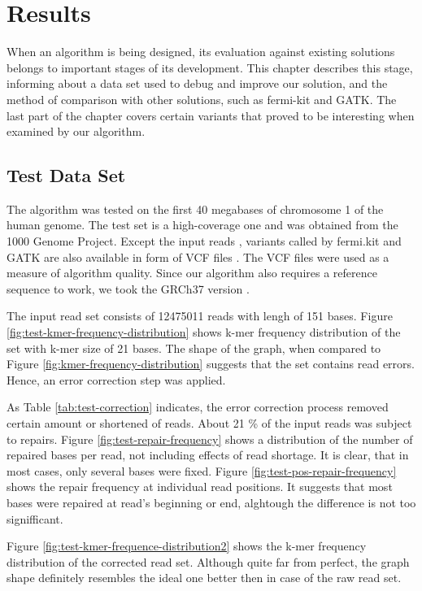 \chapter{Results}
\label{chap:results}

When an algorithm is being designed, its evaluation against existing solutions belongs to important stages of its development. This chapter describes this stage, informing about a data set used to debug and improve our solution, and the method of comparison with other solutions, such as fermi-kit and GATK. The last part of the chapter covers certain variants that proved to be interesting when examined by our algorithm.

\section{Test Data Set}
\label{sec:test-data-set}

The algorithm was tested on the first 40 megabases of chromosome 1 of the human genome. The test set is a high-coverage one and was obtained from the 1000 Genome Project. Except the input reads \cite{testreads}, variants called by fermi.kit and GATK are also available in form of VCF files \cite{testvcf}. The VCF files were used as a measure of algorithm quality. Since our algorithm also requires a reference sequence to work, we took the GRCh37 version \cite{testref}.

The input read set consists of 12475011 reads with lengh of 151 bases. Figure \ref{fig:test-kmer-frequency-distribution} shows k-mer frequency distribution of the set with k-mer size of 21 bases. The shape of the graph, when compared to Figure \ref{fig:kmer-frequency-distribution} suggests that the set contains read errors. Hence, an error correction step was applied.

As Table \ref{tab:test-correction} indicates, the error correction process removed certain amount or shortened of reads. About 21 \% of the input reads was subject to repairs. Figure \ref{fig:test-repair-frequency} shows a distribution of the number of repaired bases per read, not including effects of read shortage. It is clear, that in most cases, only several bases were fixed. Figure \ref{fig:test-pos-repair-frequency} shows the repair frequency at individual read positions. It suggests that most bases were repaired at read's beginning or end, alghtough the difference is not too signifficant.

Figure \ref{fig:test-kmer-frequence-distribution2} shows the k-mer frequency distribution of the corrected read set. Although quite far from perfect, the graph shape definitely resembles the ideal one better then in case of the raw  read set. 

